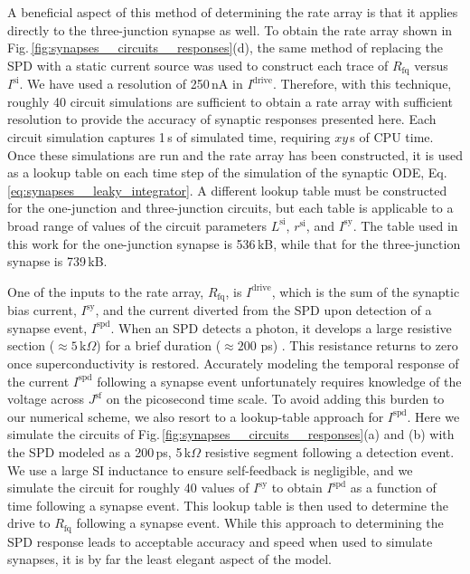 \documentclass[twocolumn]{article}
\begin{document}
A beneficial aspect of this method of determining the rate array is that it applies directly to the three-junction synapse as well. To obtain the rate array shown in Fig.\,\ref{fig:synapses__circuits__responses}(d), the same method of replacing the SPD with a static current source was used to construct each trace of $R_{\mathrm{fq}}$ versus $I^{\mathrm{si}}$. We have used a resolution of 250\,nA in $I^{\mathrm{drive}}$. Therefore, with this technique, roughly 40 circuit simulations are sufficient to obtain a rate array with sufficient resolution to provide the accuracy of synaptic responses presented here. Each circuit simulation captures 1\,\textmu s of simulated time, requiring $xy$\,s of CPU time. Once these simulations are run and the rate array has been constructed, it is used as a lookup table on each time step of the simulation of the synaptic ODE, Eq.\,\ref{eq:synapses__leaky_integrator}. A different lookup table must be constructed for the one-junction and three-junction circuits, but each table is applicable to a broad range of values of the circuit parameters $L^{\mathrm{si}}$, $r^{\mathrm{si}}$, and $I^{\mathrm{sy}}$. The table used in this work for the one-junction synapse is 536\,kB, while that for the three-junction synapse is 739\,kB.

One of the inputs to the rate array, $R_{\mathrm{fq}}$, is $I^{\mathrm{drive}}$, which is the sum of the synaptic bias current, $I^{\mathrm{sy}}$, and the current diverted from the SPD upon detection of a synapse event, $I^{\mathrm{spd}}$. When an SPD detects a photon, it develops a large resistive section ($\approx 5$\,k$\Omega$) for a brief duration ($\approx 200\,$\,ps) \cite{}. This resistance returns to zero once superconductivity is restored. Accurately modeling the temporal response of the current $I^{\mathrm{spd}}$ following a synapse event unfortunately requires knowledge of the voltage across $J^{\mathrm{sf}}$ on the picosecond time scale. To avoid adding this burden to our numerical scheme, we also resort to a lookup-table approach for $I^{\mathrm{spd}}$. Here we simulate the circuits of Fig.\,\ref{fig:synapses__circuits__responses}(a) and (b) with the SPD modeled as a 200\,ps, 5\,k$\Omega$ resistive segment following a detection event. We use a large SI inductance to ensure self-feedback is negligible, and we simulate the circuit for roughly 40 values of $I^{\mathrm{sy}}$ to obtain $I^{\mathrm{spd}}$ as a function of time following a synapse event. This lookup table is then used to determine the drive to $R_{\mathrm{fq}}$ following a synapse event. While this approach to determining the SPD response leads to acceptable accuracy and speed when used to simulate synapses, it is by far the least elegant aspect of the model.
\end{document}
